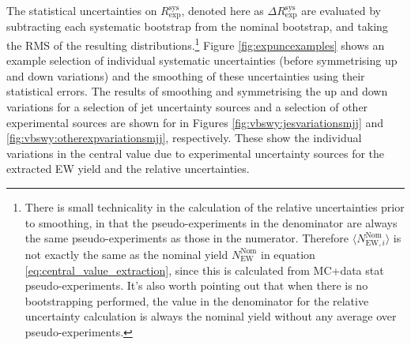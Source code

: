 The statistical uncertainties on $R^{\text{sys}}_{\text{exp}}$, denoted here as $\Delta R^{\text{sys}}_{\text{exp}}$ are evaluated by subtracting each systematic bootstrap from the nominal bootstrap, and taking the RMS of the resulting distributions.\footnote{There is small technicality in the calculation of the relative uncertainties prior to smoothing, in that the pseudo-experiments in the denominator are always the same pseudo-experiments as those in the numerator. Therefore $\langle N_{\text{EW},i}^{\text{Nom}}\rangle$ is not exactly the same as the nominal yield $N_{\text{EW}}^{\text{Nom}}$ in equation \ref{eq:central_value_extraction}, since this is calculated from MC+data stat pseudo-experiments. It's also worth pointing out that when there is no bootstrapping performed, the value in the denominator for the relative uncertainty calculation is always the nominal yield without any average over pseudo-experiments.} 
Figure \ref{fig:expuncexamples} shows an example selection of individual systematic uncertainties (before symmetrising up and down variations) and the smoothing of these uncertainties using their statistical errors. The results of smoothing and symmetrising the up and down variations for a selection of jet uncertainty sources and a selection of other experimental sources are shown for \mjj in Figures \ref{fig:vbswy:jesvariationsmjj} and \ref{fig:vbswy:otherexpvariationsmjj}, respectively. These show the individual variations in the central value due to experimental uncertainty sources for the extracted EW yield and the relative uncertainties. 

